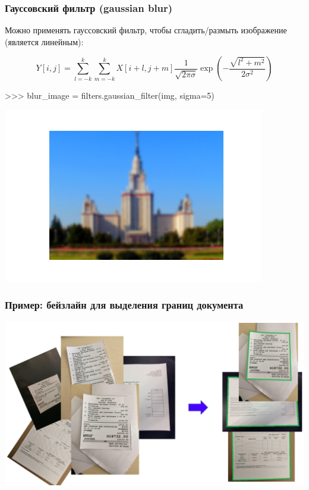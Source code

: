 \documentclass[fleqn, xcolor=x11names]{beamer}
\begin{document}
\begin{frame}[fragile]\frametitle{Гауссовский фильтр (gaussian blur)}

Можно применять гауссовский фильтр, чтобы сгладить/размыть изображение (является линейным):

\[
Y[i, j] = \sum_{l = -k}^k \sum_{m = -k}^k X[i + l, j + m] \frac{1}{\sqrt{2 \pi \sigma}} \exp\left(-\frac{\sqrt{l^2 + m^2}}{2\sigma^2}\right)
\]

\hfill

\begin{pcode}
>>> blur_image = filters.gaussian_filter(img, sigma=5)
\end{pcode}

\begin{center}
    \includegraphics[scale=0.4]{images/blur}
\end{center}

\end{frame}

\begin{frame}[fragile]\frametitle{Пример: бейзлайн для выделения границ документа}
\centering\includegraphics[scale=0.35]{images/docs_processing.png}
\end{frame}
\end{document}
